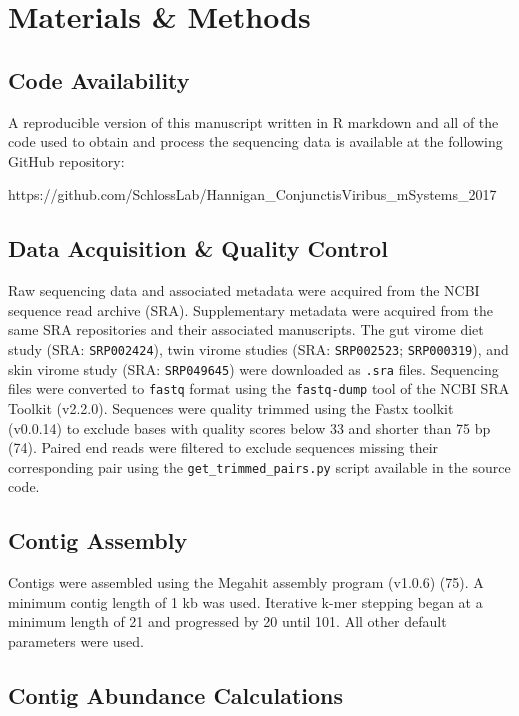\documentclass[12pt,]{article}
\begin{document}
\section{Materials \& Methods}\label{materials-methods}

\subsection{Code Availability}\label{code-availability}

A reproducible version of this manuscript written in R markdown and all
of the code used to obtain and process the sequencing data is available
at the following GitHub repository:

https://github.com/SchlossLab/Hannigan\_ConjunctisViribus\_mSystems\_2017

\subsection{Data Acquisition \& Quality
Control}\label{data-acquisition-quality-control}

Raw sequencing data and associated metadata were acquired from the NCBI
sequence read archive (SRA). Supplementary metadata were acquired from
the same SRA repositories and their associated manuscripts. The gut
virome diet study (SRA: \texttt{SRP002424}), twin virome studies (SRA:
\texttt{SRP002523}; \texttt{SRP000319}), and skin virome study (SRA:
\texttt{SRP049645}) were downloaded as \texttt{.sra} files. Sequencing
files were converted to \texttt{fastq} format using the
\texttt{fastq-dump} tool of the NCBI SRA Toolkit (v2.2.0). Sequences
were quality trimmed using the Fastx toolkit (v0.0.14) to exclude bases
with quality scores below 33 and shorter than 75 bp (74). Paired end
reads were filtered to exclude sequences missing their corresponding
pair using the \texttt{get\_trimmed\_pairs.py} script available in the
source code.

\subsection{Contig Assembly}\label{contig-assembly}

Contigs were assembled using the Megahit assembly program (v1.0.6) (75).
A minimum contig length of 1 kb was used. Iterative k-mer stepping began
at a minimum length of 21 and progressed by 20 until 101. All other
default parameters were used.

\subsection{Contig Abundance
Calculations}\label{contig-abundance-calculations}
\end{document}
